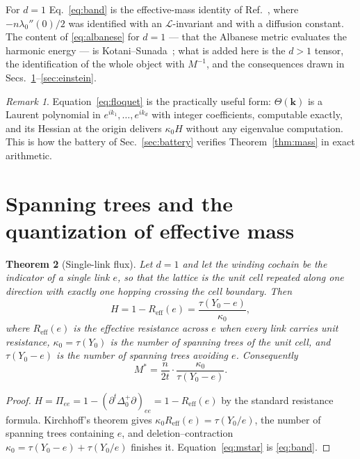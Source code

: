 \documentclass[aps,prb,reprint,amsmath,amssymb,floatfix,superscriptaddress]{revtex4-2}
\theoremstyle{plain}
\newtheorem{theorem}{Theorem}
\theoremstyle{definition}
\theoremstyle{remark}
\newtheorem{remark}[theorem]{Remark}
\newcommand{\Reff}{R_{\mathrm{eff}}}
\begin{document}
For $d=1$ Eq.~\eqref{eq:band} is the effective-mass identity of
Ref.~, where $-n\lambda_0''(0)/2$ was identified with an
$\mathcal L$-invariant and with a diffusion constant. The content of
\eqref{eq:albanese} for $d=1$ --- that the Albanese metric evaluates the harmonic energy ---
is Kotani--Sunada~\cite{KS1,KS3}; what is added here is the $d>1$ tensor, the identification
of the whole object with $M^{-1}$, and the consequences drawn in
Secs.~\ref{sec:trees}--\ref{sec:einstein}.

\begin{remark}
Equation~\eqref{eq:floquet} is the practically useful form: $\Theta(\bm k)$ is a Laurent
polynomial in $e^{ik_1},\dots,e^{ik_d}$ with integer coefficients, computable exactly, and
its Hessian at the origin delivers $\kappa_0H$ without any eigenvalue computation. This is
how the battery of Sec.~\ref{sec:battery} verifies Theorem~\ref{thm:mass} in exact
arithmetic.
\end{remark}

\section{Spanning trees and the quantization of effective mass}\label{sec:trees}

\begin{theorem}[Single-link flux]\label{thm:trees}
Let $d=1$ and let the winding cochain be the indicator of a single link $e$, so that the
lattice is the unit cell repeated along one direction with exactly one hopping crossing the
cell boundary. Then
\begin{equation}\label{eq:trees}
H=1-\Reff(e)=\frac{\tau(Y_0-e)}{\kappa_0},
\end{equation}
where $\Reff(e)$ is the effective resistance across $e$ when every link carries unit
resistance, $\kappa_0=\tau(Y_0)$ is the number of spanning trees of the unit cell, and
$\tau(Y_0-e)$ is the number of spanning trees avoiding $e$. Consequently
\begin{equation}\label{eq:mstar}
M^{*}=\frac{n}{2t}\cdot\frac{\kappa_0}{\tau(Y_0-e)} .
\end{equation}
\end{theorem}

\begin{proof}
$H=\Pi_{ee}=1-(\partial^{t}\Delta_0^{+}\partial)_{ee}=1-\Reff(e)$ by the standard
resistance formula. Kirchhoff's theorem gives $\kappa_0\Reff(e)=\tau(Y_0/e)$, the number of
spanning trees containing $e$, and deletion--contraction
$\kappa_0=\tau(Y_0-e)+\tau(Y_0/e)$ finishes it. Equation~\eqref{eq:mstar} is
\eqref{eq:band}.
\end{proof}
\end{document}

